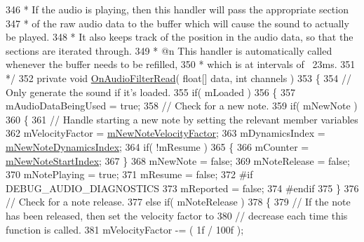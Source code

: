 \begin{DoxyCodeInclude}
346 \textcolor{comment}{     * If the audio is playing, then this handler will pass the appropriate section}
347 \textcolor{comment}{     * of the raw audio data to the buffer which will cause the sound to actually be played. }
348 \textcolor{comment}{     * It also keeps track of the position in the audio data, so that the sections are iterated through.}
349 \textcolor{comment}{     * @n This handler is automatically called whenever the buffer needs to be refilled,}
350 \textcolor{comment}{     * which is at intervals of ~23ms.}
351 \textcolor{comment}{    */}
352     \textcolor{keyword}{private} \textcolor{keywordtype}{void} \hyperlink{group___n_o_o_handlers_gaafd22f8a8c8d2cf101a54a4bf92782a5}{OnAudioFilterRead}( \textcolor{keywordtype}{float}[] data, \textcolor{keywordtype}{int} channels )
353     \{
354         \textcolor{comment}{// Only generate the sound if it's loaded.}
355         \textcolor{keywordflow}{if}( mLoaded )
356         \{
357             mAudioDataBeingUsed = \textcolor{keyword}{true};
358             \textcolor{comment}{// Check for a new note.}
359             \textcolor{keywordflow}{if}( mNewNote )
360             \{
361                 \textcolor{comment}{// Handle starting a new note by setting the relevant member variables}
362                 mVelocityFactor = \hyperlink{group___n_o_o_priv_var_gaf3cd650d21c56c25ce988d9f75279278}{mNewNoteVelocityFactor};
363                 mDynamicsIndex = \hyperlink{group___n_o_o_priv_var_ga13de232048b35fc513f8aa3eeef65de0}{mNewNoteDynamicsIndex};
364                 \textcolor{keywordflow}{if}( !mResume )
365                 \{
366                     mCounter = \hyperlink{group___n_o_o_priv_var_ga93720712088a4b6f91abe63d6f07a2c2}{mNewNoteStartIndex};
367                 \}
368                 mNewNote = \textcolor{keyword}{false};
369                 mNoteRelease = \textcolor{keyword}{false};
370                 mNotePlaying = \textcolor{keyword}{true};
371                 mResume = \textcolor{keyword}{false};
372 \textcolor{preprocessor}{                #if DEBUG\_AUDIO\_DIAGNOSTICS}
373                     mReported = \textcolor{keyword}{false};
374 \textcolor{preprocessor}{                #endif}
375             \}
376             \textcolor{comment}{// Check for a note release.}
377             \textcolor{keywordflow}{else} \textcolor{keywordflow}{if}( mNoteRelease )
378             \{
379                 \textcolor{comment}{// If the note has been released, then set the velocity factor to }
380                 \textcolor{comment}{// decrease each time this function is called.}
381                 mVelocityFactor -= ( 1f / 100f );

\end{DoxyCodeInclude}

